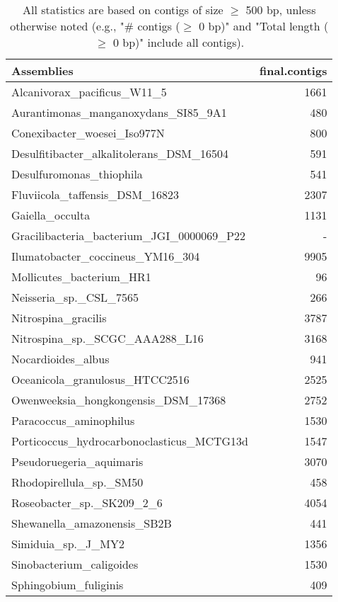 \documentclass[12pt,a4paper]{article}
\begin{document}
\begin{table}[ht]
\begin{center}
\caption{All statistics are based on contigs of size $\geq$ 500 bp, unless otherwise noted (e.g., "\# contigs ($\geq$ 0 bp)" and "Total length ($\geq$ 0 bp)" include all contigs).}
\begin{tabular}{|l*{1}{|r}|}
\hline
Assemblies & final.contigs \\ \hline
Alcanivorax\_pacificus\_W11\_5 & 1661 \\ \hline
Aurantimonas\_manganoxydans\_SI85\_9A1 & 480 \\ \hline
Conexibacter\_woesei\_Iso977N & 800 \\ \hline
Desulfitibacter\_alkalitolerans\_DSM\_16504 & 591 \\ \hline
Desulfuromonas\_thiophila & 541 \\ \hline
Fluviicola\_taffensis\_DSM\_16823 & 2307 \\ \hline
Gaiella\_occulta & 1131 \\ \hline
Gracilibacteria\_bacterium\_JGI\_0000069\_P22 & - \\ \hline
Ilumatobacter\_coccineus\_YM16\_304 & 9905 \\ \hline
Mollicutes\_bacterium\_HR1 & 96 \\ \hline
Neisseria\_sp.\_CSL\_7565 & 266 \\ \hline
Nitrospina\_gracilis & 3787 \\ \hline
Nitrospina\_sp.\_SCGC\_AAA288\_L16 & 3168 \\ \hline
Nocardioides\_albus & 941 \\ \hline
Oceanicola\_granulosus\_HTCC2516 & 2525 \\ \hline
Owenweeksia\_hongkongensis\_DSM\_17368 & 2752 \\ \hline
Paracoccus\_aminophilus & 1530 \\ \hline
Porticoccus\_hydrocarbonoclasticus\_MCTG13d & 1547 \\ \hline
Pseudoruegeria\_aquimaris & 3070 \\ \hline
Rhodopirellula\_sp.\_SM50 & 458 \\ \hline
Roseobacter\_sp.\_SK209\_2\_6 & 4054 \\ \hline
Shewanella\_amazonensis\_SB2B & 441 \\ \hline
Simiduia\_sp.\_J\_MY2 & 1356 \\ \hline
Sinobacterium\_caligoides & 1530 \\ \hline
Sphingobium\_fuliginis & 409 \\ \hline

\end{tabular}
\end{center}
\end{table}
\end{document}
